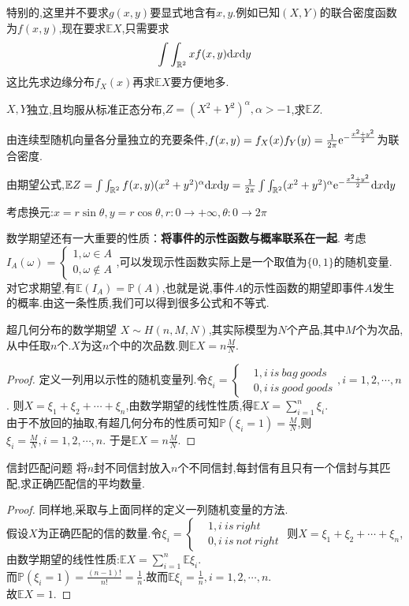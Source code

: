 \documentclass[lang=cn,10pt]{elegantbook}
\begin{document}
特别的,这里并不要求$g(x,y)$要显式地含有$x,y$.例如已知$(X,Y)$的联合密度函数为$f(x,y)$,现在要求$\mathbb{E}X$,只需要求
$$\int\int_{\mathbb{R}^2}xf(x,y){\rm d}x{\rm d}y$$
这比先求边缘分布$f_X(x)$再求$\mathbb{E}X$要方便地多.
\begin{example}
    $X,Y$独立,且均服从标准正态分布,$Z=(X^2+Y^2)^\alpha,\alpha>-1$,求$\mathbb{E}Z$.
\end{example}
{\fangsong 
    
由连续型随机向量各分量独立的充要条件,$f(x,y)=f_X(x)f_Y(y)=\frac{1}{2\pi}{\rm e}^{-\frac{x^2+y^2}{2}}$为联合密度.

由期望公式,$\mathbb{E}Z=\int\int_{\mathbb{R}^2}f(x,y)(x^2+y^2)^\alpha {\rm d}x{\rm d}y=\frac{1}{2\pi}\int\int_{\mathbb{R}^2}(x^2+y^2)^\alpha {\rm e}^{-\frac{x^2+y^2}{2}}{\rm d}x{\rm d}y$

考虑换元:$x=r\sin\theta,y=r\cos\theta,r:0\to +\infty,\theta:0\to 2\pi $
}
数学期望还有一大重要的性质：\textbf{将事件的示性函数与概率联系在一起}.
考虑$I_A(\omega)=\left\{\begin{aligned}1,\omega\in A\\0,\omega \notin A\end{aligned}\right.$,可以发现示性函数实际上是一个取值为$\{0,1\}$的随机变量.
对它求期望,有$\mathbb{E}(I_A)=\mathbb{P}(A)$,也就是说,事件$A$的示性函数的期望即事件$A$发生的概率.由这一条性质,我们可以得到很多公式和不等式.
\begin{theorem}{超几何分布的数学期望}{}
    $X\sim H(n,M,N)$,其实际模型为$N$个产品,其中$M$个为次品,从中任取$n$个.$X$为这$n$个中的次品数.则$\mathbb{E}X=n\frac{M}{N}$.
\end{theorem}
\begin{proof}
    定义一列用以示性的随机变量列.令$\xi_i=\left\{\begin{aligned}&1,i\ is \ bag \ goods\\ &0,i\ is\ good\ goods\end{aligned}\right.,i=1,2,\cdots,n$.
    则$X=\xi_1+\xi_2+\cdots+\xi_n$,由数学期望的线性性质,得$\mathbb{E}X=\sum_{i=1}^n\xi_i$.\\
    由于不放回的抽取,有超几何分布的性质可知$\mathbb{P}(\xi_i=1)=\frac{M}{N}$,则$\xi_i=\frac{M}{N},i=1,2,\cdots,n$.
    于是$\mathbb{E}X=n\frac{M}{N}$.
\end{proof}
\begin{proposition}{信封匹配问题}{}
    将$n$封不同信封放入$n$个不同信封,每封信有且只有一个信封与其匹配,求正确匹配信的平均数量.
\end{proposition}
\begin{proof}
    同样地,采取与上面同样的定义一列随机变量的方法.\\
    假设$X$为正确匹配的信的数量.令$\xi_i=\left\{\begin{aligned}&1,i\ is\ right\\ &0,i\ is\ not\ right\end{aligned}\right.$
    则$X=\xi_1+\xi_2+\cdots+\xi_n$,由数学期望的线性性质:$\mathbb{E}X=\sum_{i=1}^{n}\mathbb{E}\xi_i$.\\
    而$\mathbb{P}(\xi_i=1)=\frac{(n-1)!}{n!}=\frac{1}{n}$.故而$\mathbb{E}\xi_i=\frac{1}{n},i=1,2,\cdots,n$.\\
    故$\mathbb{E}X=1$.
\end{proof}
\end{document}
